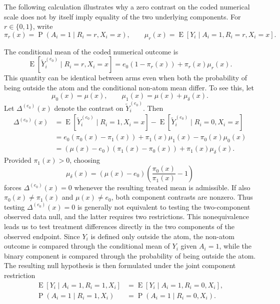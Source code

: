 \documentclass[11pt]{article}
\DeclareMathOperator{\E}{E}
\DeclareMathOperator{\Prob}{P}
\begin{document}
The following calculation illustrates why a zero contrast on the coded numerical scale does not by itself imply equality of the two underlying components. For $r\in\{0,1\}$, write
\[
  \pi_r(x)=\Prob(A_i=1\mid R_i=r,X_i=x),
  \qquad
  \mu_r(x)=\E[Y_i\mid A_i=1,R_i=r,X_i=x].
\]

The conditional mean of the coded numerical outcome is
\[
  \E[\widetilde{Y}_i^{(e_0)}\mid R_i=r,X_i=x]
  = e_0(1-\pi_r(x))+\pi_r(x)\mu_r(x).
\]
This quantity can be identical between arms even when both the probability of being outside the atom and the conditional non-atom mean differ. To see this, let
\[
  \mu_0(x)=\mu(x),
  \qquad
  \mu_1(x)=\mu(x)+\mu_\delta(x).
\]
Let $\Delta^{(e_0)}(x)$ denote the contrast on $\widetilde{Y}_i^{(e_0)}$. Then
\begin{align*}
  \Delta^{(e_0)}(x)
  &= \E[\widetilde{Y}_i^{(e_0)}\mid R_i=1,X_i=x]
     -\E[\widetilde{Y}_i^{(e_0)}\mid R_i=0,X_i=x]\\
  &= e_0(\pi_0(x)-\pi_1(x))
     +\pi_1(x)\mu_1(x)-\pi_0(x)\mu_0(x)\\
  &= (\mu(x)-e_0)(\pi_1(x)-\pi_0(x))
     +\pi_1(x)\mu_\delta(x).
\end{align*}
Provided $\pi_1(x)>0$, choosing
\[
  \mu_\delta(x) = (\mu(x)-e_0) \left(\frac{\pi_0(x)}{\pi_1(x)}-1\right)
\]
forces $\Delta^{(e_0)}(x)=0$ whenever the resulting treated mean is admissible. If also $\pi_0(x)\ne\pi_1(x)$ and $\mu(x)\ne e_0$, both component contrasts are nonzero. Thus testing $\Delta^{(e_0)}(x)=0$ is generally not equivalent to testing the two-component observed data null, and the latter requires two restrictions. This nonequivalence leads us to test treatment differences directly in the two components of the observed endpoint. Since $Y_i$ is defined only outside the atom, the non-atom outcome is compared through the conditional mean of $Y_i$ given $A_i=1$, while the binary component is compared through the probability of being outside the atom. The resulting null hypothesis is then formulated under the joint component restriction
\begin{align*}
  \E[Y_i \mid A_i = 1, R_i = 1, X_i]
  &= \E[Y_i \mid A_i = 1, R_i = 0, X_i],\\
  \Prob(A_i = 1 \mid R_i = 1, X_i)
  &= \Prob(A_i = 1 \mid R_i = 0, X_i).
\end{align*}
\end{document}
